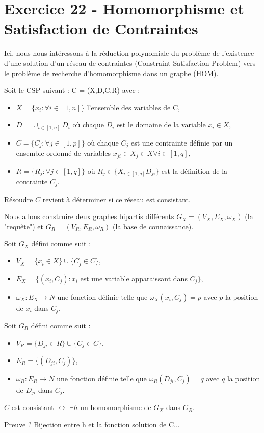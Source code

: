 
\section{Exercice 22 - Homomorphisme et Satisfaction de Contraintes}\label{ex22}
Ici, nous nous int\'eressons \`a la r\'eduction polynomiale du probl\`eme de l'existence
d'une solution d'un r\'eseau de contraintes (Constraint Satisfaction Problem)
vers le probl\`eme de recherche d'homomorphisme dans un graphe (HOM).

Soit le CSP suivant : C = (X,D,C,R) avec :
\begin{itemize}
	\item $X = \{x_i : \forall i \in [1,n]\}$ l'ensemble des variables de C,
	\item $D = \cup_{i \in [1,n]}D_i$ o\`u chaque $D_i$ est le domaine de la variable
	$x_i \in X$,
	\item $C = \{C_j : \forall j \in [1,p]\}$ o\`u chaque $C_j$ est une contrainte
	d\'efinie par un ensemble ordonn\'e de variables $x_{ji} \in X_j \in X \forall i \in
	[1,q]$,
	\item $R = \{R_j : \forall j \in [1,q]\}$ o\`u $R_j \in \{X_{i \in [1,q]}D_{ji}\}$ est
	la d\'efinition de la contrainte $C_j$.
\end{itemize}
R\'esoudre $C$ revient \`a d\'eterminer si ce r\'eseau est consistant.

Nous allons construire deux graphes bipartis diff\'erents $G_{X} = (V_X,E_X,\omega_X)$ (la
"requ\^ete") et $G_R = (V_R,E_R,\omega_R)$ (la base de connaissance).

Soit $G_X$ d\'efini comme suit :
\begin{itemize}
	\item $V_X = \{x_i \in X\} \cup \{C_j \in C\}$,
	\item $E_X = \{(x_i,C_j) : x_i$ est une variable apparaissant dans $C_j \}$,
	\item $\omega_X : E_X \rightarrow N$ une fonction d\'efinie telle que
	$\omega_X(x_i,C_j) = p$ avec $p$ la position de $x_i$ dans $C_j$.
\end{itemize}

Soit $G_R$ d\'efini comme suit :
\begin{itemize}
	\item $V_R = \{D_{ji} \in R\} \cup \{C_j \in C\}$,
	\item $E_R = \{(D_{ji},C_j)\}$,
	\item $\omega_R : E_R \rightarrow N$ une fonction d\'efinie telle que
	$\omega_R(D_{ji},C_j) = q$ avec $q$ la position de $D_{ji}$ dans $C_j$.
\end{itemize}

$C$ est consistant $\leftrightarrow$ $\exists h$ un homomorphisme de $G_X$ dans $G_R$.

Preuve ?
Bijection entre h et la fonction solution de C...


